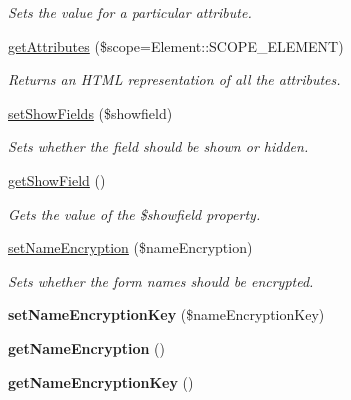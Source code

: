 \begin{DoxyCompactItemize}
\begin{DoxyCompactList}\small\item\em Sets the value for a particular attribute. \item\end{DoxyCompactList}\item 
\hyperlink{class_element_af497a5a5da60b86c9678d89e2bbfe65b}{getAttributes} (\$scope=Element::SCOPE\_\-ELEMENT)
\begin{DoxyCompactList}\small\item\em Returns an HTML representation of all the attributes. \item\end{DoxyCompactList}\item 
\hyperlink{class_element_a0bcc67e2e4881c478f26cb51c1856b6a}{setShowFields} (\$showfield)
\begin{DoxyCompactList}\small\item\em Sets whether the field should be shown or hidden. \item\end{DoxyCompactList}\item 
\hypertarget{class_element_aafd2f0a37e5e8e652d36545c3e8602fb}{
\hyperlink{class_element_aafd2f0a37e5e8e652d36545c3e8602fb}{getShowField} ()}
\label{class_element_aafd2f0a37e5e8e652d36545c3e8602fb}

\begin{DoxyCompactList}\small\item\em Gets the value of the \$showfield property. \item\end{DoxyCompactList}\item 
\hyperlink{class_element_a0be16568225df436cf790b4f1c272b17}{setNameEncryption} (\$nameEncryption)
\begin{DoxyCompactList}\small\item\em Sets whether the form names should be encrypted. \item\end{DoxyCompactList}\item 
\hypertarget{class_element_a7ef59b7c14969fc41be2d1a6b9860a81}{
{\bfseries setNameEncryptionKey} (\$nameEncryptionKey)}
\label{class_element_a7ef59b7c14969fc41be2d1a6b9860a81}

\item 
\hypertarget{class_element_ab8da57c76b650062b15b70d37a8effe6}{
{\bfseries getNameEncryption} ()}
\label{class_element_ab8da57c76b650062b15b70d37a8effe6}

\item 
\hypertarget{class_element_a797cfd726ae98f2dc3b67b7ad84f1b2d}{
{\bfseries getNameEncryptionKey} ()}
\label{class_element_a797cfd726ae98f2dc3b67b7ad84f1b2d}


\end{DoxyCompactItemize}
